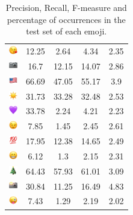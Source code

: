 \documentclass{article}
\begin{document}
\begin{table}
\begin{tabular}{|c|ccc|c|}
\includegraphics[height=0.37cm,width=0.37cm]{img/face_blowing_a_kiss.png} & 12.25 & 2.64 & 4.34 & 2.35\\ 
\includegraphics[height=0.37cm,width=0.37cm]{img/camera.png} & 16.7 & 12.15 & 14.07 & 2.86\\ 
\includegraphics[height=0.37cm,width=0.37cm]{img/United_States.png} & 66.69 & 47.05 & 55.17 & 3.9\\ 
\includegraphics[height=0.37cm,width=0.37cm]{img/sun.png} & 31.73 & 33.28 & 32.48 & 2.53\\ 
\includegraphics[height=0.37cm,width=0.37cm]{img/purple_heart.png} & 33.78 & 2.24 & 4.21 & 2.23\\ 
\includegraphics[height=0.37cm,width=0.37cm]{img/winking_face.png} & 7.85 & 1.45 & 2.45 & 2.61\\ 
\includegraphics[height=0.37cm,width=0.37cm]{img/hundred_points.png} & 17.95 & 12.38 & 14.65 & 2.49\\ 
\includegraphics[height=0.37cm,width=0.37cm]{img/beaming_face_with_smiling_eyes.png} & 6.12 & 1.3 & 2.15 & 2.31\\ 
\includegraphics[height=0.37cm,width=0.37cm]{img/Christmas_tree.png} & 64.43 & 57.93 & 61.01 & 3.09\\ 
\includegraphics[height=0.37cm,width=0.37cm]{img/camera_with_flash.png} & 30.84 & 11.25 & 16.49 & 4.83\\ 
\includegraphics[height=0.37cm,width=0.37cm]{img/winking_face_with_tongue.png} & 7.43 & 1.29 & 2.19 & 2.02\\ 

\hline
\end{tabular}
\caption{\label{table:emoji_detailed} Precision, Recall, F-measure and percentage of occurrences in the test set of each emoji.}
\end{table}
\end{document}
